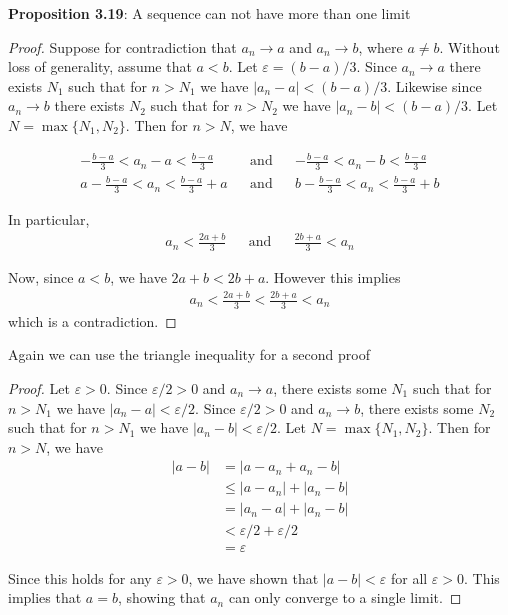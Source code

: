 \documentclass{article}
\begin{document}
\textbf{Proposition 3.19}: A sequence can not have more than one limit
\begin{proof}
	Suppose for contradiction that $a_n \rightarrow a$ and $a_n \rightarrow b$, where $a \neq b$. Without loss of generality,
	assume that $a < b$. Let $\varepsilon = (b - a)/ 3$. Since $a_n \rightarrow a$ there exists $N_1$ such that for $n > N_1$ we have
	$|a_n - a| < (b - a)/ 3$. Likewise since $a_n \rightarrow b$ there exists $N_2$ such that for $n > N_2$ we have $|a_n - b| < (b - a)/ 3$.
	Let $N = \max\{N_1, N_2\}$. Then for $n > N$, we have

	\begin{align*}
		-\frac{b - a}{3} < a_n - a < \frac{b - a}{3}   &  & \text{and} &  & -\frac{b - a}{3} < a_n - b < \frac{b - a}{3}    \\
		a -\frac{b - a}{3} < a_n < \frac{b - a}{3} + a &  & \text{and} &  & b - \frac{b - a}{3} < a_n < \frac{b - a}{3} + b
	\end{align*}

	In particular,
	\begin{align*}
		a_n < \frac{2a + b}{3} &  & \text{and} &  & \frac{2b + a}{3} < a_n
	\end{align*}

	Now, since $a < b$, we have $2a + b < 2b + a$. However this implies
	\begin{align*}
		a_n < \frac{2a + b}{3} < \frac{2b + a}{3} < a_n
	\end{align*}
	which is a contradiction.
\end{proof}

Again we can use the triangle inequality for a second proof
\begin{proof}
	Let $\varepsilon > 0$. Since $\varepsilon/2 > 0$ and $a_n \rightarrow a$, there exists some $N_1$ such that for $n > N_1$
	we have $|a_n - a| < \varepsilon/2$. Since $\varepsilon/2 > 0$ and $a_n \rightarrow b$, there exists some $N_2$ such that for $n > N_1$
	we have $|a_n - b| < \varepsilon/2$. Let $N = \max\{N_1, N_2\}$. Then for $n > N$, we have
	\begin{align*}
		|a - b| & = |a - a_n + a_n - b|           \\
		        & \le |a - a_n| + |a_n - b|       \\
		        & = |a_n - a| + |a_n - b|         \\
		        & < \varepsilon/2 + \varepsilon/2 \\
		        & = \varepsilon
	\end{align*}

	Since this holds for any $\varepsilon > 0$, we have shown that $|a - b| < \varepsilon$ for all $\varepsilon > 0$. This implies that
	$a = b$, showing that $a_n$ can only converge to a single limit.
\end{proof}
\end{document}
